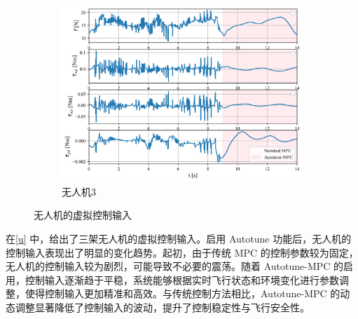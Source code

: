 \documentclass[lang=chs, degree=master, blindreview=false, winfonts=true]{yanputhesis}
\begin{document}
\begin{figure}[H]
	\begin{subfigure}[b]{0.48\textwidth}  %
		\centering
		\includegraphics[width=\textwidth]{picture/kk/3.png}
		\caption{无人机3}
		\label{quadrotoru2}
	\end{subfigure}
	\caption{无人机的虚拟控制输入}
	\label{u}
\end{figure}


在\autoref{u} 中，给出了三架无人机的虚拟控制输入。启用 Autotune 功能后，无人机的控制输入表现出了明显的变化趋势。起初，由于传统 MPC 的控制参数较为固定，无人机的控制输入较为剧烈，可能导致不必要的震荡。随着 Autotune-MPC 的启用，控制输入逐渐趋于平稳，系统能够根据实时飞行状态和环境变化进行参数调整，使得控制输入更加精准和高效。与传统控制方法相比，Autotune-MPC 的动态调整显著降低了控制输入的波动，提升了控制稳定性与飞行安全性。
\end{document}
